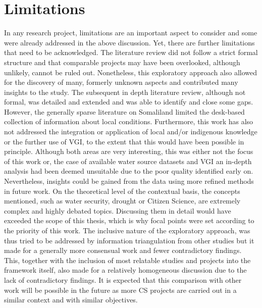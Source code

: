 

\section{Limitations}
In any research project, limitations are an important aspect to consider and some were already addressed in the above discussion. Yet, there are further limitations that need to be acknowledged. The literature review did not follow a strict formal structure and that comparable projects may have been overlooked, although unlikely, cannot be ruled out. Nonetheless, this exploratory approach also allowed for the discovery of many, formerly unknown aspects and contributed many insights to the study. The subsequent in depth literature review, although not formal, was detailed and extended and was able to identify and close some gaps. However, the generally sparse literature on Somaliland limited the desk-based collection of information about local conditions. Furthermore, this work has also not addressed the integration or application of local and/or indigenous knowledge or the further use of VGI, to the extent that this would have been possible in principle. Although both areas are very interesting, this was either not the focus of this work or, the case of available water source datasets and VGI an in-depth analysis had been deemed unsuitable due to the poor quality identified early on. Nevertheless, insights could be gained from the data using more refined methods in future work. On the theoretical level of the contextual basis, the concepts mentioned, such as water security, drought or Citizen Science, are extremely complex and highly debated topics. Discussing them in detail would have exceeded the scope of this thesis, which is why focal points were set according to the priority of this work.\newline
The inclusive nature of the exploratory approach, was thus tried to be addressed by information triangulation from other studies but it made for a generally more consensual work and fewer contradictory findings. This, together with the inclusion of most relatable studies and projects into the framework itself, also made for a relatively homogeneous discussion due to the lack of contradictory findings. It is expected that this comparison with other work will be possible in the future as more CS projects are carried out in a similar context and with similar objectives.\newline
